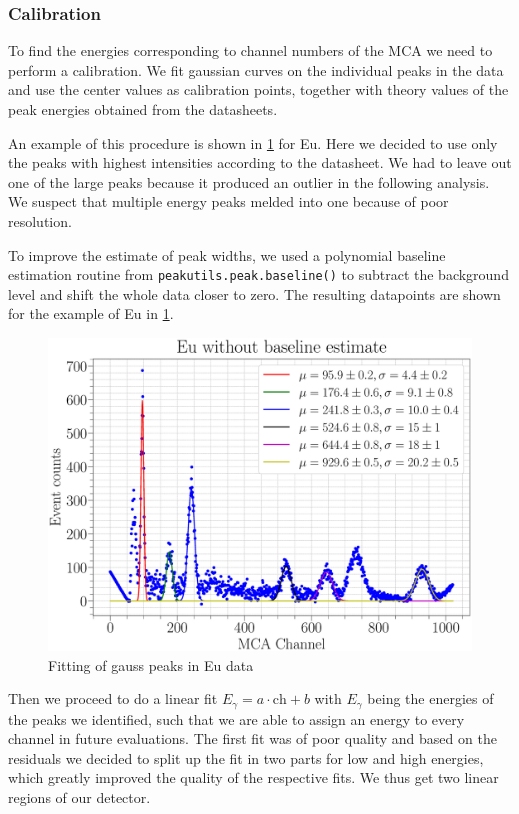 \documentclass[a4paper,12pt]{article}
\newcommand{\code}[1]{\colorbox{codegray}{\texttt{#1}}}
\begin{document}
\subsubsection{Calibration}
To find the energies corresponding to channel numbers of the MCA we need to perform a calibration. We fit gaussian curves on the individual peaks in the data and use the center values as calibration points, together with theory values of the peak energies obtained from the datasheets.

An example of this procedure is shown in \cref{Eu_gauss} for Eu. Here we decided to use only the peaks with highest intensities according to the datasheet. We had to leave out one of the large peaks because it produced an outlier in the following analysis. We suspect that multiple energy peaks melded into one because of poor resolution.

To improve the estimate of peak widths, we used a polynomial baseline estimation routine from \code{peakutils.peak.baseline()} to subtract the background level and shift the whole data closer to zero. The resulting datapoints are shown for the example of Eu in \cref{Eu_gauss}.

\begin{figure}[H]
	\centering
	\includegraphics[scale=0.3]{../Figures/Eu_nobaseline.eps}
	\caption{Fitting of gauss peaks in Eu data}
	\label{Eu_gauss}
\end{figure}

Then we proceed to do a linear fit $E_{\gamma} = a \cdot \mathrm{ch}+ b$ with $E_{\gamma}$ being the energies of the peaks we identified, such that we are able to assign an energy to every channel in future evaluations.
The first fit was of poor quality and based on the residuals we decided to split up the fit in two parts for low and high energies, which greatly improved the quality of the respective fits. We thus get two linear regions of our detector.
\end{document}
